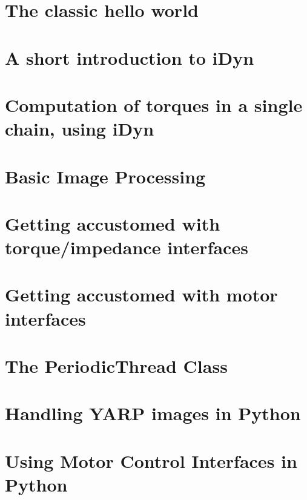 \let\mypdfximage\pdfximage\def\pdfximage{\immediate\mypdfximage}\documentclass[twoside]{book}
\newcommand{\+}{\discretionary{\mbox{\scriptsize$\hookleftarrow$}}{}{}}
\begin{document}
\chapter{The classic hello world}
\label{icub_hello_icub}

\chapter{A short introduction to i\+Dyn}
\label{idyn_introduction}

\chapter{Computation of torques in a single chain, using i\+Dyn}
\label{idyn_one_chain_tutorial}

\chapter{Basic Image Processing}
\label{icub_basic_image_processing}

\chapter{Getting accustomed with torque/impedance interfaces}
\label{icub_impedance_control_tutorial}

\chapter{Getting accustomed with motor interfaces}
\label{icub_motor_control_tutorial}

\chapter{The Periodic\+Thread Class}
\label{icub_periodic_thread}

\chapter{Handling YARP images in Python}
\label{icub_python_imaging}

\chapter{Using Motor Control Interfaces in Python}
\label{icub_python_basic_motor}

\end{document}
